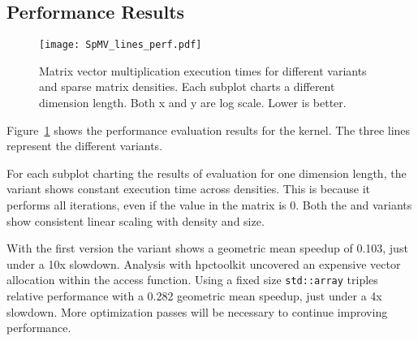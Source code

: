 \subsection{Performance Results}
\begin{figure}
\texttt{[image: SpMV\_lines\_perf.pdf]}
\caption{Matrix vector multiplication execution times for different variants and sparse matrix densities. Each subplot charts a different dimension length. Both x and y are log scale. Lower is better.}
\label{SpMVPerformance}
\end{figure}
Figure~\ref{SpMVPerformance} shows the performance evaluation results for the \SpMV{} kernel. 
The three lines represent the different variants.

For each subplot charting the results of evaluation for one dimension length, the \dense{} variant shows constant execution time across densities.
This is because it performs all iterations, even if the value in the matrix is 0.
Both the \sparseraja{} and \specialized{} variants show consistent linear scaling with density and size. 


With the first version the \sparseraja{} variant shows a geometric mean speedup of 0.103, just under a 10x slowdown.
Analysis with hpctoolkit uncovered an expensive vector allocation within the access function.
Using a fixed size \verb.std::array. triples relative performance with a 0.282 geometric mean speedup, just under a 4x slowdown.
More optimization passes will be necessary to continue improving performance.

